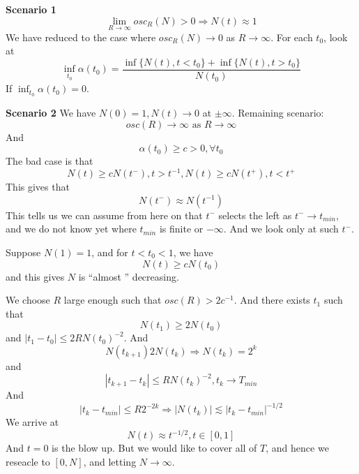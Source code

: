 \textbf{Scenario 1}
\begin{equation*}
    \lim_{R\to\infty}osc_R(N)>0 \Rightarrow N(t)\approx 1
\end{equation*}
We have reduced to the case where $osc_R(N)\to 0$ as $R\to\infty$. For each $t_0$, look at
\begin{equation*}
    \inf_{t_0}\alpha(t_0)=\frac{\inf\{N(t), t<t_0\}+\inf\{N(t), t>t_0\}}{N(t_0)}
\end{equation*}
If $\inf_{t_0}\alpha(t_0)=0$.

\textbf{Scenario 2}
We have $N(0)=1, N(t)\to 0$ at $\pm\infty$. Remaining scenario:
\begin{equation*}
    osc(R)\to\infty \text{ as } R\to\infty
\end{equation*}
And 
\begin{equation*}
    \alpha(t_0)\geq c>0, \forall t_0
\end{equation*}
The bad case is that
\begin{equation*}
    N(t)\geq cN(t^{-}), t>t^{-1}, N(t)\geq cN(t^+), t<t^+
\end{equation*}
This gives that
\begin{equation*}
    N(t^-)\approx N(t^{-1})
\end{equation*}
This tells us we can assume from here on that $t^-$ selects the left as $t^-\to t_{min}$, and we do not know yet where $t_{min}$ is finite or $-\infty$. And we look only at such $t^-$.

Suppose $N(1)=1$, and for $t<t_0<1$, we have 
\begin{equation*}
    N(t)\geq cN(t_0)
\end{equation*}
and this gives $N$ is ``almost '' decreasing.

We choose $R$ large enough such that $osc(R)>2 c^{-1}$. And there exists $t_1$ such that 
\begin{equation*}
    N(t_1)\geq 2N(t_0)
\end{equation*}
and $|t_1-t_0|\leq 2RN(t_0)^{-2}$.
And 
\begin{equation*}
    N(t_{k+1})2N(t_k)\Rightarrow N(t_k)=2^k
\end{equation*}
and 
\begin{equation*}
    |t_{k+1}-t_k|\leq RN(t_k)^{-2}, t_k\rightarrow T_{min}
\end{equation*}
And 
\begin{equation*}
    |t_k-t_{min}|\leq R2^{-2k}\Rightarrow |N(t_k)|\lesssim |t_k-t_{min}|^{-1/2}
\end{equation*}
We arrive at 
\begin{equation*}
    N(t)\approx t^{-1/2}, t\in [0,1]
\end{equation*}
And $t=0$ is the blow up. But we would like to cover all of $T$, and hence we reseacle to $[0,N]$, and letting $N\to\infty$.

